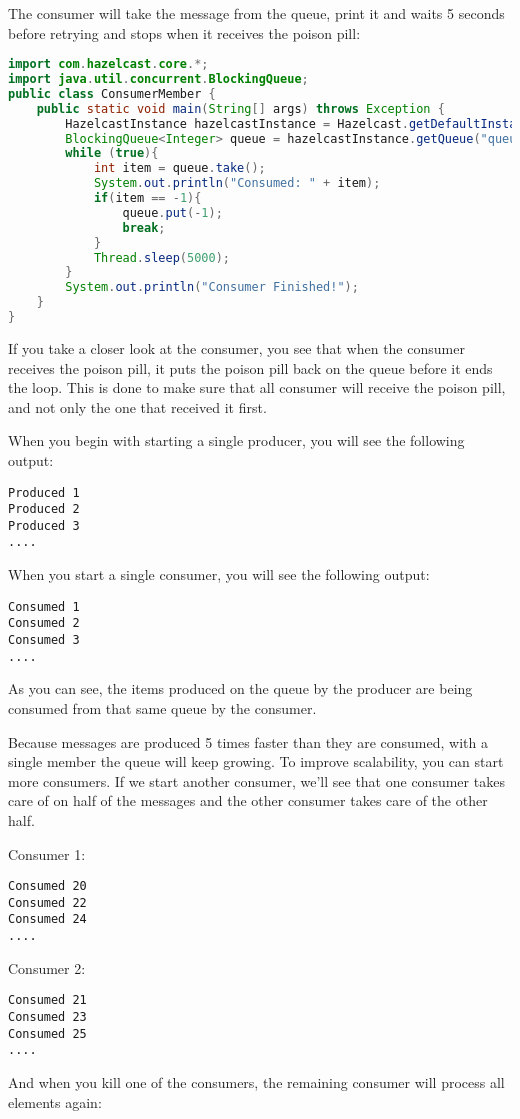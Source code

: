 The consumer will take the message from the queue, print it and waits 5 seconds before retrying and stops when it receives the poison pill:
\begin{lstlisting}[language=java]
import com.hazelcast.core.*;
import java.util.concurrent.BlockingQueue;
public class ConsumerMember {
    public static void main(String[] args) throws Exception {
        HazelcastInstance hazelcastInstance = Hazelcast.getDefaultInstance();
        BlockingQueue<Integer> queue = hazelcastInstance.getQueue("queue");
        while (true){
            int item = queue.take();
            System.out.println("Consumed: " + item);
            if(item == -1){
                queue.put(-1);
                break;
            }     
            Thread.sleep(5000);            
        }
        System.out.println("Consumer Finished!");
    }
}
\end{lstlisting}
If you take a closer look at the consumer, you see that when the consumer receives the poison pill, it puts the poison pill back on the queue before it ends the loop. This is done to make sure that all consumer will receive the poison pill, and not only the one that received it first.

When you begin with starting a single producer, you will see the following output:
\begin{verbatim}
Produced 1
Produced 2
Produced 3
....
\end{verbatim}
When you start a single consumer, you will see the following output:
\begin{verbatim}
Consumed 1
Consumed 2
Consumed 3
....
\end{verbatim}
As you can see, the items produced on the queue by the producer are being consumed from that same queue by the consumer. 

Because messages are produced 5 times faster than they are consumed, with a single member the queue will keep growing. To improve scalability, you can start more consumers. If we start another consumer, we'll see that one consumer takes care of on half of the messages and the other consumer takes care of the other half.

Consumer 1:
\begin{verbatim}
Consumed 20
Consumed 22
Consumed 24
....
\end{verbatim}
Consumer 2:
\begin{verbatim}
Consumed 21
Consumed 23
Consumed 25
....
\end{verbatim}
And when you kill one of the consumers, the remaining consumer will process all elements again:


